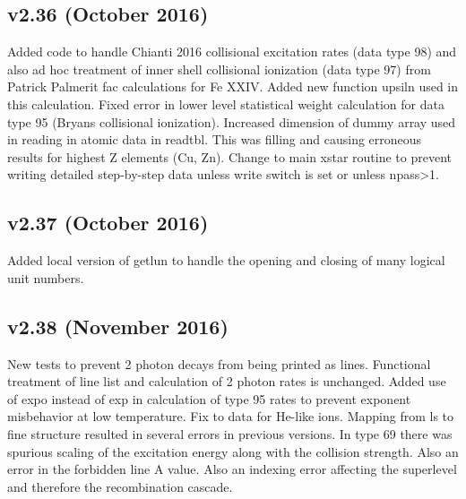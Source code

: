 \subsection{v2.36 (October 2016)}

Added code to handle Chianti 2016 collisional excitation rates (data type 98) and also ad hoc treatment of inner shell collisional ionization (data type 97) from Patrick Palmerit fac calculations for Fe XXIV.
Added new function upsiln used in this calculation.
Fixed error in lower level statistical weight calculation for data type 95 (Bryans collisional ionization).
Increased dimension of dummy array used in reading in atomic data in readtbl.  This was filling and causing erroneous results for highest Z elements (Cu, Zn).
Change to main xstar routine to prevent writing detailed step-by-step data unless write switch is set or unless npass>1.

\subsection{v2.37 (October 2016)}

Added local version of getlun to handle the opening and closing of many logical unit numbers.  

\subsection{v2.38 (November 2016)}

New tests to prevent 2 photon decays from being printed as lines.  Functional treatment of line list and calculation of 2 photon rates is unchanged.
Added use of expo instead of exp in calculation of type 95 rates to prevent exponent misbehavior at low temperature.
Fix to data for He-like ions.  Mapping from ls to fine structure resulted in several errors in previous versions.  In type 69 there was spurious scaling of the excitation energy along with the collision strength.  Also an error in the forbidden line A value.  Also an indexing error affecting the superlevel and therefore the recombination cascade.










